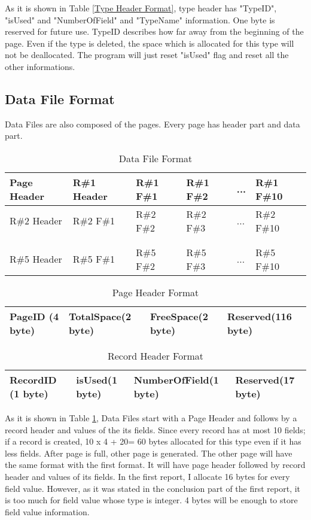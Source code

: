 \documentclass[12pt]{article}
\begin{document}
As it is shown in Table \ref{Type Header Format}, type header has "TypeID", "isUsed" and "NumberOfField" and "TypeName" information. One byte is reserved for future use. TypeID describes how far away from the beginning of the page. Even if the type is deleted, the space which is allocated for this type will not be deallocated. The program will just reset "isUsed" flag and reset all the other informations.

\subsection{Data File Format}
Data Files are also composed of the pages. Every page has header part and data part.

\begin{table}[H]
\centering
\caption{Data File Format}
\label{Data File Format}
\begin{tabular}{ | l | l | l | l | l | l |}
\hline
 Page Header & R\#1 Header & R\#1 F\#1 & R\#1 F\#2 & ... & R\#1 F\#10 \\
\hline
 R\#2 Header & R\#2 F\#1 & R\#2 F\#2 & R\#2 F\#3 & ... & R\#2 F\#10 \\
\hline
 &  &  &  &  & \\
\hline
 &  &  &  &  & \\
\hline 
 R\#5 Header & R\#5 F\#1 & R\#5 F\#2 & R\#5 F\#3 & ... & R\#5 F\#10 \\
\hline 
\end{tabular}
\end{table}

\begin{table}[H]
\centering
\caption{Page Header Format}
\label{Data File Page Header Format}
\begin{tabular}{ | l | l | l | l |}
\hline
 PageID (4 byte) & TotalSpace(2 byte) & FreeSpace(2 byte) & Reserved(116 byte) \\
\hline
\end{tabular}
\end{table}

\begin{table}[H]
\centering
\caption{Record Header Format}
\label{Record Header Format}
\begin{tabular}{ | l | l | l | l |}
\hline
 RecordID (1 byte) & isUsed(1 byte) & NumberOfField(1 byte) & Reserved(17 byte) \\
\hline
\end{tabular}
\end{table}

As it is shown in Table \ref{Data File Format}, Data Files start with a Page Header and follows by a record header and values of the its fields. Since every record has at most 10 fields; if a record is created, 10 x 4 + 20= 60 bytes allocated for this type even if it has less fields. After page is full, other page is generated. The other page will have the same format with the first format. It will have page header followed by record header and values of its fields. In the first report, I allocate 16 bytes for every field value. However, as it was stated in the conclusion part of the first report, it is too much for field value whose type is integer. 4 bytes will be enough to store field value information.
\end{document}
